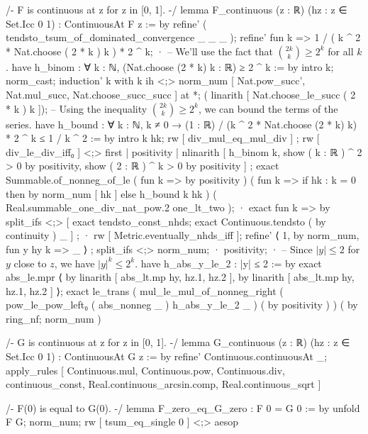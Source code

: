 /-
F is continuous at z for z in [0, 1].
-/
lemma F_continuous (z : ℝ) (hz : z ∈ Set.Icc 0 1) : ContinuousAt F z := by
  refine' ( tendsto_tsum_of_dominated_convergence _ _ _ );
  refine' fun k => 1 / ( k ^ 2 * Nat.choose ( 2 * k ) k ) * 2 ^ k;
  · -- We'll use the fact that $\binom{2k}{k} \geq 2^k$ for all $k$.
    have h_binom : ∀ k : ℕ, (Nat.choose (2 * k) k : ℝ) ≥ 2 ^ k := by
      intro k; norm_cast; induction' k with k ih <;> norm_num [ Nat.pow_succ', Nat.mul_succ, Nat.choose_succ_succ ] at *; (
      linarith [ Nat.choose_le_succ ( 2 * k ) k ]);
    -- Using the inequality $\binom{2k}{k} \geq 2^k$, we can bound the terms of the series.
    have h_bound : ∀ k : ℕ, k ≠ 0 → (1 : ℝ) / (k ^ 2 * Nat.choose (2 * k) k) * 2 ^ k ≤ 1 / k ^ 2 := by
      intro k hk; rw [ div_mul_eq_mul_div ] ; rw [ div_le_div_iff₀ ] <;> first | positivity | nlinarith [ h_binom k, show ( k : ℝ ) ^ 2 > 0 by positivity, show ( 2 : ℝ ) ^ k > 0 by positivity ] ;
    exact Summable.of_nonneg_of_le ( fun k => by positivity ) ( fun k => if hk : k = 0 then by norm_num [ hk ] else h_bound k hk ) ( Real.summable_one_div_nat_pow.2 one_lt_two );
  · exact fun k => by split_ifs <;> [ exact tendsto_const_nhds; exact Continuous.tendsto ( by continuity ) _ ] ;
  · rw [ Metric.eventually_nhds_iff ];
    refine' ⟨ 1, by norm_num, fun y hy k => _ ⟩ ; split_ifs <;> norm_num;
    · positivity;
    · -- Since $|y| \leq 2$ for $y$ close to $z$, we have $|y|^k \leq 2^k$.
      have h_abs_y_le_2 : |y| ≤ 2 := by
        exact abs_le.mpr ⟨ by linarith [ abs_lt.mp hy, hz.1, hz.2 ], by linarith [ abs_lt.mp hy, hz.1, hz.2 ] ⟩;
      exact le_trans ( mul_le_mul_of_nonneg_right ( pow_le_pow_left₀ ( abs_nonneg _ ) h_abs_y_le_2 _ ) ( by positivity ) ) ( by ring_nf; norm_num )

/-
G is continuous at z for z in [0, 1].
-/
lemma G_continuous (z : ℝ) (hz : z ∈ Set.Icc 0 1) : ContinuousAt G z := by
  refine' Continuous.continuousAt _;
  apply_rules [ Continuous.mul, Continuous.pow, Continuous.div, continuous_const, Real.continuous_arcsin.comp, Real.continuous_sqrt ]

/-
F(0) is equal to G(0).
-/
lemma F_zero_eq_G_zero : F 0 = G 0 := by
  unfold F G; norm_num;
  rw [ tsum_eq_single 0 ] <;> aesop


